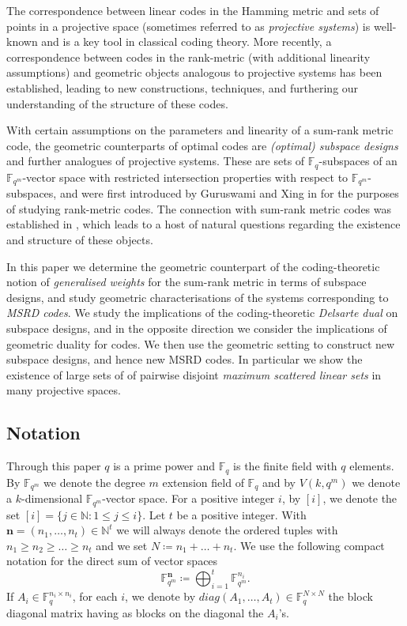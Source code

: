 \documentclass[11pt]{amsart}
\theoremstyle{definition}
\newcommand{\F}{{\mathbb F}}
\newcommand{\NN}{{\mathbb N}}
\newcommand{\bfn}{\mathbf {n}}
\newcommand{\Fq}{{\mathbb F}_{q}}
\newcommand{\Fm}{{\mathbb F}_{q^m}}
\begin{document}


The correspondence between linear codes in the Hamming metric and sets of points in a projective space (sometimes referred to as {\it projective systems}) is well-known and is a key tool in classical coding theory. More recently, a correspondence between codes in the rank-metric (with additional linearity assumptions) and geometric objects analogous to projective systems has been established, leading to new constructions, techniques, and furthering our understanding of the structure of these codes.  

With certain assumptions on the parameters and linearity of a sum-rank metric code, the geometric counterparts of optimal codes are {\it (optimal) subspace designs} and further analogues of projective systems. These are sets of $\Fq$-subspaces of an $\Fm$-vector space with restricted intersection properties with respect to $\Fm$-subspaces, and were first introduced by Guruswami and Xing in \cite{guruswami2016explicit} for the purposes of studying rank-metric codes. The connection with sum-rank metric codes was established in \cite{neri2023geometry}, which leads to a host of natural questions regarding the existence and structure of these objects.



In this paper we determine the geometric counterpart of the coding-theoretic notion of {\it generalised weights} for the sum-rank metric in terms of subspace designs, and study geometric characterisations of the systems corresponding to {\it MSRD codes}. We study the implications of the coding-theoretic {\it Delsarte dual} on subspace designs, and in the opposite direction we consider the implications of  geometric duality for codes. We then use the geometric setting to construct new subspace designs, and hence new MSRD codes. In particular we show the existence of large sets of of pairwise disjoint {\it maximum scattered linear sets} in many projective spaces.



\subsection{Notation}

Through this paper $q$ is a prime power and $\Fq$ is the finite field with $q$ elements. By $\Fm$ we denote the degree $m$ extension field  of $\Fq$ and by $V(k,q^m)$ we denote a $k$-dimensional $\F_{q^m}$-vector space. For a positive integer $i$, by $[i]$, we denote the set $[i]=\{j \in \mathbb{N}: 1 \leq j \leq i\}$.
\noindent Let $t$ be a positive integer. With
$\bfn=(n_1,\ldots,n_t) \in \NN^t$ we will always denote the ordered tuples with $n_1 \geq n_2 \geq \ldots \geq n_t$ and we set $N\coloneqq n_1+\ldots+n_t$. We use the following compact notation for the direct sum of vector spaces 
$$ \Fm^\bfn\coloneqq\bigoplus_{i=1}^t\Fm^{n_i}.$$
If $A_i \in \F_{q}^{n_i \times n_i}$, for each $i$, we denote by $diag(A_1,\ldots,A_t) \in \F_q^{N \times N}$ the block diagonal matrix having as blocks on the diagonal the $A_i$'s. 
\end{document}
